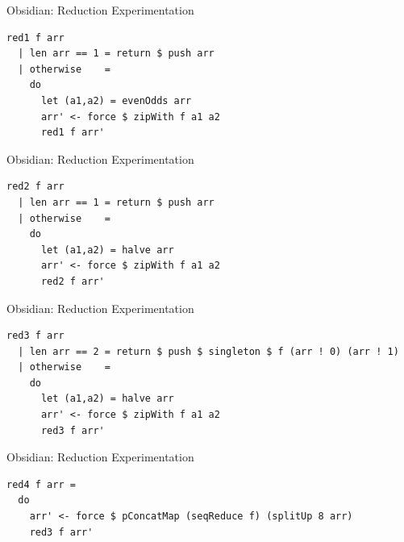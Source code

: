 \documentclass[xcolor=dvipsnames]{beamer}
\begin{document}
\begin{frame}[fragile]{Obsidian: Reduction Experimentation}

  \begin{block}{} 
    
\Fontvi
\begin{verbatim}
red1 f arr
  | len arr == 1 = return $ push arr
  | otherwise    = 
    do
      let (a1,a2) = evenOdds arr
      arr' <- force $ zipWith f a1 a2
      red1 f arr'
\end{verbatim} 
    
  \end{block}

\end{frame} 

\begin{frame}[fragile]{Obsidian: Reduction Experimentation}

  \begin{block}{} 
    
\Fontvi
\begin{verbatim}
red2 f arr
  | len arr == 1 = return $ push arr
  | otherwise    = 
    do
      let (a1,a2) = halve arr
      arr' <- force $ zipWith f a1 a2
      red2 f arr'   
\end{verbatim} 
    
  \end{block}

\end{frame} 

\begin{frame}[fragile]{Obsidian: Reduction Experimentation}

  \begin{block}{} 
    
\Fontvi
\begin{verbatim}
red3 f arr
  | len arr == 2 = return $ push $ singleton $ f (arr ! 0) (arr ! 1) 
  | otherwise    = 
    do
      let (a1,a2) = halve arr
      arr' <- force $ zipWith f a1 a2
      red3 f arr'   
\end{verbatim} 
    
  \end{block}

\end{frame} 

\begin{frame}[fragile]{Obsidian: Reduction Experimentation}

  \begin{block}{} 
    
\Fontvi
\begin{verbatim}
red4 f arr =
  do
    arr' <- force $ pConcatMap (seqReduce f) (splitUp 8 arr)
    red3 f arr' 
\end{verbatim} 
    
  \end{block}

\end{frame} 
\end{document}
